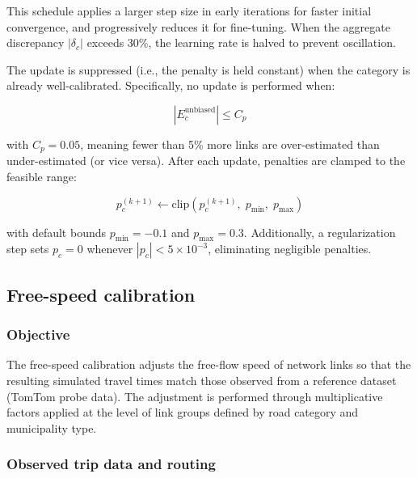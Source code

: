 This schedule applies a larger step size in early iterations for faster initial convergence, and progressively reduces it for fine-tuning. When the aggregate discrepancy $|\delta_c|$ exceeds 30\%, the learning rate is halved to prevent oscillation.

The update is suppressed (i.e., the penalty is held constant) when the category is already well-calibrated. Specifically, no update is performed when:

\begin{equation}
    |E_c^{\text{unbiased}}| \leq C_p
    \label{eq:penalty_convergence}
\end{equation}

\noindent with $C_p = 0.05$, meaning fewer than 5\% more links are over-estimated than under-estimated (or vice versa). After each update, penalties are clamped to the feasible range:

\begin{equation}
    p_c^{(k+1)} \leftarrow \text{clip}\!\left(p_c^{(k+1)},\; p_{\min},\; p_{\max}\right)
    \label{eq:penalty_clamp}
\end{equation}

\noindent with default bounds $p_{\min} = -0.1$ and $p_{\max} = 0.3$. Additionally, a regularization step sets $p_c = 0$ whenever $|p_c| < 5 \times 10^{-3}$, eliminating negligible penalties.

\subsection{Free-speed calibration}
\label{sec:freespeed_calibration}

\subsubsection{Objective}

The free-speed calibration adjusts the free-flow speed of network links so that the resulting simulated travel times match those observed from a reference dataset (TomTom probe data). The adjustment is performed through multiplicative factors applied at the level of link groups defined by road category and municipality type.

\subsubsection{Observed trip data and routing}

